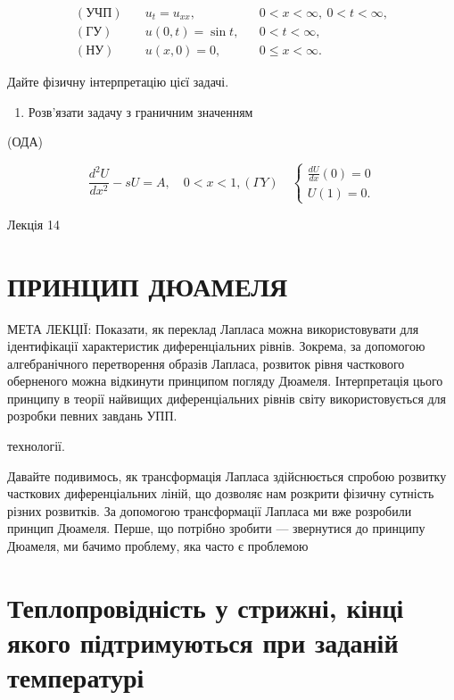 \documentclass[
  ukrainian,
]{article}
\providecommand{\tightlist}{%
  \setlength{\itemsep}{0pt}\setlength{\parskip}{0pt}}
\begin{document}
\[
\begin{aligned}
(\text{УЧП})\quad & u_t = u_{xx}, && 0 < x < \infty,\ 0 < t < \infty, \\
(\text{ГУ})\quad & u(0,t) = \sin t, && 0 < t < \infty, \\
(\text{НУ})\quad & u(x,0) = 0, && 0 \leqslant x < \infty.
\end{aligned}
\]

Дайте фізичну інтерпретацію цієї задачі.

\begin{enumerate}
\def\labelenumi{\arabic{enumi}.}
\setcounter{enumi}{3}
\tightlist
\item
  Розв'язати задачу з граничним значенням
\end{enumerate}

(ОДА)

\[
\frac{d^2U}{dx^2} - sU = A, \quad 0 < x < 1,
(\Gamma Y) \quad
\begin{cases} \frac{dU}{dx} (0) = 0 \\ U(1) = 0. \end{cases}
\]

Лекція 14

\section{ПРИНЦИП
ДЮАМЕЛЯ}\label{ux43fux440ux438ux43dux446ux438ux43f-ux434ux44eux430ux43cux435ux43bux44f}

МЕТА ЛЕКЦІЇ: Показати, як переклад Лапласа можна використовувати для
ідентифікації характеристик диференціальних рівнів. Зокрема, за
допомогою алгебранічного перетворення образів Лапласа, розвиток рівня
часткового оберненого можна відкинути принципом погляду Дюамеля.
Інтерпретація цього принципу в теорії найвищих диференціальних рівнів
світу використовується для розробки певних завдань УПП.

технології.

Давайте подивимось, як трансформація Лапласа здійснюється спробою
розвитку часткових диференціальних ліній, що дозволяє нам розкрити
фізичну сутність різних розвитків. За допомогою трансформації Лапласа ми
вже розробили принцип Дюамеля. Перше, що потрібно зробити --- звернутися
до принципу Дюамеля, ми бачимо проблему, яка часто є проблемою

\section{Теплопровідність у стрижні, кінці якого підтримуються при
заданій
температурі}\label{ux442ux435ux43fux43bux43eux43fux440ux43eux432ux456ux434ux43dux456ux441ux442ux44c-ux443-ux441ux442ux440ux438ux436ux43dux456-ux43aux456ux43dux446ux456-ux44fux43aux43eux433ux43e-ux43fux456ux434ux442ux440ux438ux43cux443ux44eux442ux44cux441ux44f-ux43fux440ux438-ux437ux430ux434ux430ux43dux456ux439-ux442ux435ux43cux43fux435ux440ux430ux442ux443ux440ux456}
\end{document}
